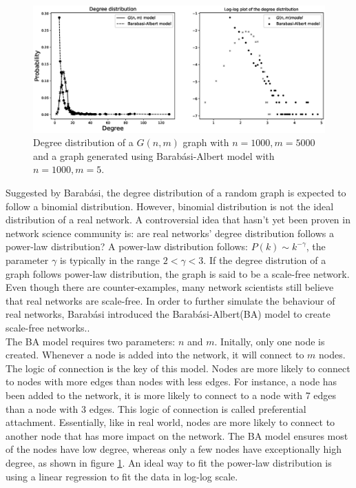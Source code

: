 \documentclass[12pt]{article}
\begin{document}
\begin{figure}[ht]
    \centering
    \includegraphics[width=\textwidth]{degree_distribution.eps}
    \centering
    \caption{Degree distribution of a $G(n,m)$ graph with $n=1000,m=5000$ and a graph generated using Barabási-Albert model with $n=1000,m=5$.}
    \label{fig:degree_dist}
\end{figure}
\noindent
Suggested by Barabási\cite{barabási2016network}, the degree distribution of a random graph is expected to follow a binomial distribution. However, binomial distribution is not the ideal distribution of a real network. A controversial idea that hasn't yet been proven in network science community is: are real networks' degree distribution follows a power-law distribution? A power-law distribution follows: $P(k) \sim k^{-\gamma }$, the parameter $\gamma$ is typically in the range $2<\gamma<3$. If the degree distrution of a graph follows power-law distribution, the graph is said to be a scale-free network. Even though there are counter-examples, many network scientists still believe that real networks are scale-free. In order to further simulate the behaviour of real networks, Barabási introduced the Barabási-Albert(BA) model to create scale-free networks.\cite{barabási2016network}.\\
The BA model requires two parameters: $n$ and $m$. Initally, only one node is created. Whenever a node is added into the network, it will connect to $m$ nodes. The logic of connection is the key of this model. Nodes are more likely to connect to nodes with more edges than nodes with less edges. For instance, a node has been added to the network, it is more likely to connect to a node with 7 edges than a node with 3 edges. This logic of connection is called preferential attachment. Essentially, like in real world, nodes are more likely to connect to another node that has more impact on the network.\cite{pa_test} The BA model ensures most of the nodes have low degree, whereas only a few nodes have exceptionally high degree, as shown in figure \ref{fig:degree_dist}. An ideal way to fit the power-law distribution is using a linear regression to fit the data in log-log scale.
\end{document}
